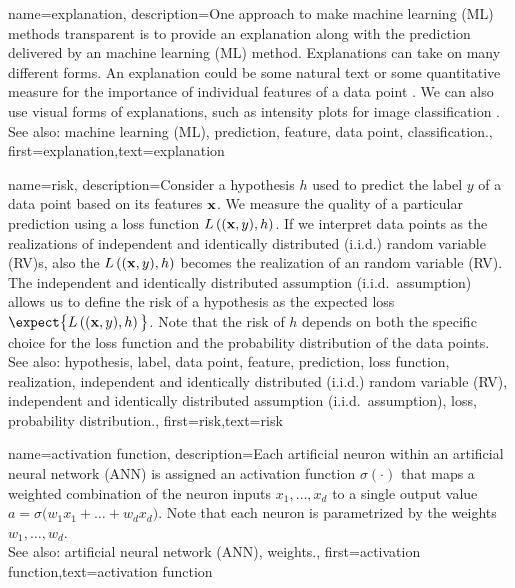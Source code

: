 {name={explanation},
	description={One approach to make machine learning (ML) methods transparent is to provide an 
		explanation along with the prediction delivered by an 
		machine learning (ML) method. Explanations can take on many different forms. An explanation 
		could be some natural text or some quantitative measure for the importance 
		of individual features of a data point \cite{Molnar2019}. We can also 
		use visual forms of explanations, such as intensity plots for image classification \cite{GradCamPaper}.
					\\ 
		See also: machine learning (ML), prediction, feature, data point, classification.},
	first={explanation},text={explanation} 
}

{name={risk},
	description={Consider a hypothesis $h$ used to predict the label 
		$y$ of a data point based on its features ${\bf x}$. We measure 
		the quality of a particular prediction using a loss function $L\left(({\bf x},y),h \right)$. 
		If we interpret data points as the realizations of independent and identically distributed (i.i.d.) random variable (RV)s, 
		also the $L\left(({\bf x},y),h \right)$ becomes the realization 
		of an random variable (RV). The independent and identically distributed assumption (i.i.d.\ assumption) allows us to define the risk of a hypothesis 
		as the expected loss $\expect \big\{L\left(({\bf x},y),h \right) \big\}$. 
		Note that the risk of $h$ depends on both the specific choice for the loss function and the 
		probability distribution of the data points.
					\\ 
		See also: hypothesis, label, data point, feature, prediction, loss function, realization, independent and identically distributed (i.i.d.) random variable (RV), independent and identically distributed assumption (i.i.d.\ assumption), loss, probability distribution.},
	first={risk},text={risk} 
}

{name={activation function},
	description={Each artificial neuron within an artificial neural network (ANN) is 
		assigned an activation function $\sigma(\cdot)$ that maps a weighted combination of 
		the neuron inputs $x_{1},\ldots,x_{d}$ to a single output 
		value $a = \sigma\big(w_{1} x_{1}+\ldots+w_{d} x_{d} \big)$. 
		Note that each neuron is parametrized by the weights $w_{1},\ldots,w_{d}$.
					\\ 
		See also: artificial neural network (ANN), weights.},
first={activation function},text={activation function} 
}

